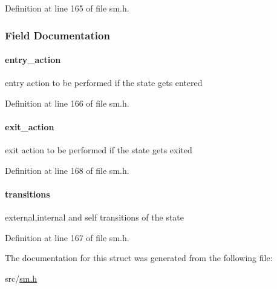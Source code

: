 Definition at line 165 of file sm.\+h.



\subsubsection{Field Documentation}
\paragraph[{\texorpdfstring{entry\+\_\+action}{entry_action}}]{ entry\+\_\+action}\hypertarget{structsm__state__t_ae5671e79c3bc83130bdeaf82c82e6f05}{}\label{structsm__state__t_ae5671e79c3bc83130bdeaf82c82e6f05}
entry action to be performed if the state gets entered 

Definition at line 166 of file sm.\+h.

\paragraph[{\texorpdfstring{exit\+\_\+action}{exit_action}}]{ exit\+\_\+action}\hypertarget{structsm__state__t_af372299be3ffdd7c40f91d0c0239839a}{}\label{structsm__state__t_af372299be3ffdd7c40f91d0c0239839a}
exit action to be performed if the state gets exited 

Definition at line 168 of file sm.\+h.

\paragraph[{\texorpdfstring{transitions}{transitions}}]{ transitions}\hypertarget{structsm__state__t_ace0f4ad76339cbc43c48c99df054e401}{}\label{structsm__state__t_ace0f4ad76339cbc43c48c99df054e401}
external,internal and self transitions of the state 

Definition at line 167 of file sm.\+h.



The documentation for this struct was generated from the following file\+:\begin{DoxyCompactItemize}
\item 
src/\hyperlink{sm_8h}{sm.\+h}\end{DoxyCompactItemize}
